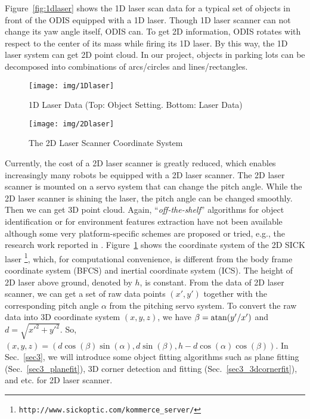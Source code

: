 \documentclass[twocolumn]{IEEEtran}
\begin{document}
Figure~\ref{fig:1dlaser} shows the 1D laser scan data for a typical set of objects in front of the ODIS equipped with a 1D laser. %
Though 1D laser scanner can not change its yaw angle itself, ODIS can. To get 2D information, ODIS rotates with respect to the center of its mass while firing its 1D laser. By this way, the 1D laser system can get 2D point cloud. 
In our project, objects in parking lots can be  decomposed into  combinations of  arcs/circles and lines/rectangles. 

\begin{figure}[!htb]
    \begin{minipage}[t]{0.24\textwidth}
    \center\texttt{[image: img/1Dlaser]}
    \caption{1D Laser Data (Top: Object Setting.  Bottom: Laser Data)}
        \label{fig:1dlaser}
    \end{minipage}%
    \begin{minipage}[t]{0.24\textwidth}
        \center
        \texttt{[image: img/2Dlaser]}
        \caption{The 2D Laser Scanner Coordinate System}  \label{fig:2dlaser}
    \end{minipage}
\end{figure}

Currently, the cost of a 2D laser scanner is greatly reduced, which enables increasingly many robots be equipped with a 2D laser scanner. The 2D laser scanner is mounted on a servo system that can change the pitch angle. While the 2D laser scanner is shining the laser, the pitch angle can be changed smoothly. Then we can get 3D point cloud. Again, ``{\em off-the-shelf}'' algorithms for object identification or for environment features extraction have not been available although some very platform-specific schemes are proposed or tried, e.g., the research work reported in \cite{Dedieu00Mixed,Hartmart2001ISR,Taylor1996,Vandorpe1996,Cadenat2000,Laurent1997,Borenstein96WhereAmI}. %
Figure~\ref{fig:2dlaser} shows the coordinate system of the 2D SICK laser \footnote{\texttt{http://www.sickoptic.com/kommerce\_server/}}, which, for computational  convenience, is different from the body frame coordinate system (BFCS) and inertial coordinate system (ICS). The height of 2D laser above ground, denoted by $h$,  is  constant. From the data of 2D laser scanner, we can get a set of raw data points $(x',y')$ together with  the corresponding pitch angle $\alpha$ from the pitching servo system. To convert the raw data into 3D coordinate system $(x,y,z)$, we have
$   \beta={\rm atan} (y'/x')  $ and $ d = \sqrt{x'^2 + y'^2} $. So, $ (x,y,z)=(d \cos(\beta)\sin(\alpha), d \sin(\beta), h-d \cos(\alpha)\cos(\beta) )$.
In Sec.~\ref{sec3}, we will introduce some object fitting algorithms such as plane fitting (Sec.~\ref{sec3_planefit}), 3D corner detection  and  fitting (Sec.~\ref{sec3_3dcornerfit}), and etc. for 2D laser scanner.
\end{document}
